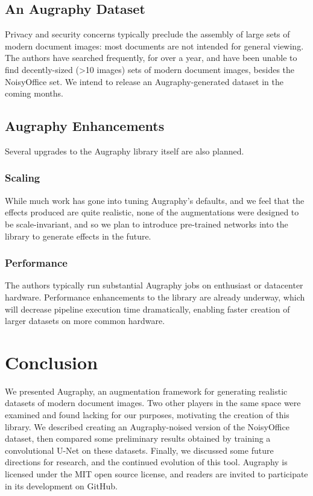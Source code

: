\documentclass[runningheads]{llncs}
\begin{document}
\subsection{An Augraphy Dataset}
Privacy and security concerns typically preclude the assembly of large sets of modern document images: most documents are not intended for general viewing. The authors have searched frequently, for over a year, and have been unable to find decently-sized (>10 images) sets of modern document images, besides the NoisyOffice set. We intend to release an Augraphy-generated dataset in the coming months.

\subsection{Augraphy Enhancements}
Several upgrades to the Augraphy library itself are also planned.

\subsubsection{Scaling}
While much work has gone into tuning Augraphy's defaults, and we feel that the effects produced are quite realistic, none of the augmentations were designed to be scale-invariant, and so we plan to introduce pre-trained networks into the library to generate effects in the future.

\subsubsection{Performance}
The authors typically run substantial Augraphy jobs on enthusiast or datacenter hardware. Performance enhancements to the library are already underway, which will decrease pipeline execution time dramatically, enabling faster creation of larger datasets on more common hardware.

\section{Conclusion}
We presented Augraphy, an augmentation framework for generating realistic datasets of modern document images. Two other players in the same space were examined and found lacking for our purposes, motivating the creation of this library. We described creating an Augraphy-noised version of the NoisyOffice dataset, then compared some preliminary results obtained by training a convolutional U-Net on these datasets. Finally, we discussed some future directions for research, and the continued evolution of this tool. Augraphy is licensed under the MIT open source license, and readers are invited to participate in its development on GitHub.
\end{document}
